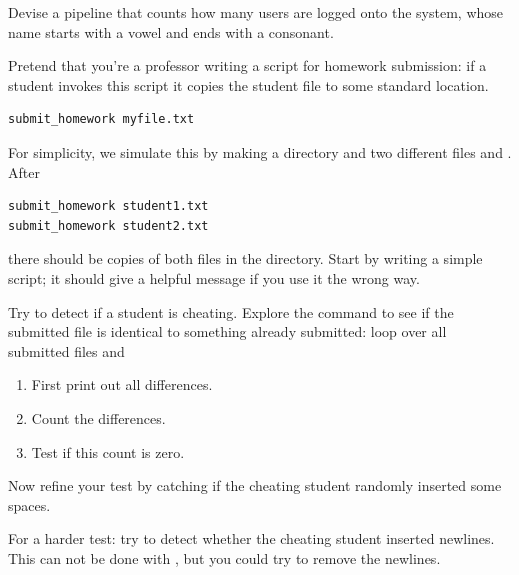 \begin{exercise}
    Devise a pipeline that counts how many users are logged onto
    the system, whose name starts with a vowel and ends with a
    consonant.
\end{exercise}

\begin{exercise}
  \label{tut:ex:plagiarism}
  Pretend that you're a professor writing a script for homework
  submission: if a student invokes this script it copies the student
  file to some standard location.
\begin{lstlisting}
submit_homework myfile.txt
\end{lstlisting}
  For simplicity, we simulate this by making a directory
   and two different files  and
  . After
\begin{lstlisting}
submit_homework student1.txt
submit_homework student2.txt
\end{lstlisting}
  there should be copies of both files in the 
  directory. Start by writing a simple script; it should give a
  helpful message if you use it the wrong way.

  Try to detect if a student is cheating. Explore the
   command to see if the submitted file is
  identical to something already submitted:
  loop over all submitted files and
  \begin{enumerate}
  \item First print out all differences.
  \item Count the differences.
  \item Test if this count is zero.
  \end{enumerate}
  Now refine your test by catching if the cheating student randomly
  inserted some spaces.

  For a harder test: try to detect whether the cheating student
  inserted newlines. This can not be done with , but you could
  try  to remove the newlines.
\end{exercise}

\lstset{language=C}




